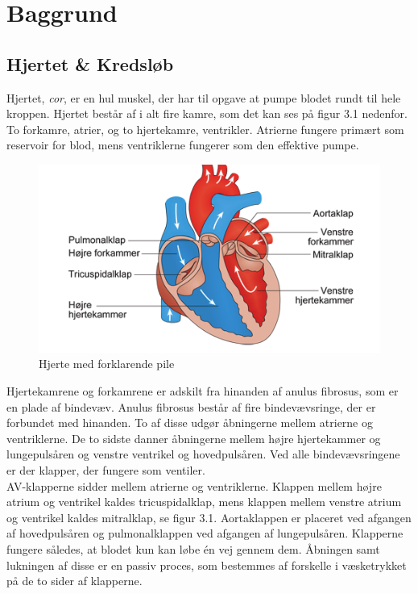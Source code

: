 \chapter{Baggrund}
\section{Hjertet \& Kredsløb}
Hjertet, \textit{cor}, er en hul muskel, der har til opgave at pumpe blodet rundt til hele kroppen. Hjertet består af i alt fire kamre, som det kan ses på figur 3.1 nedenfor. To forkamre, atrier, og to hjertekamre, ventrikler. Atrierne fungere primært som reservoir for blod, mens ventriklerne fungerer som den effektive pumpe.\\

\begin{figure}[htb]
	\centering
	\includegraphics[width=1\textwidth]{Figurer/Fysio/Hjertet}
	\caption{Hjerte med forklarende pile \protect\footnotemark} 
\end{figure}

Hjertekamrene og forkamrene er adskilt fra hinanden af anulus fibrosus, som er en plade af bindevæv. Anulus fibrosus består af fire bindevævsringe, der er forbundet med hinanden. To af disse udgør åbningerne mellem atrierne og ventriklerne. De to sidste danner åbningerne mellem højre hjertekammer og lungepulsåren og venstre ventrikel og hovedpulsåren. Ved alle bindevævsringene er der klapper, der fungere som ventiler.\\ 
AV-klapperne sidder mellem atrierne og ventriklerne. Klappen mellem højre atrium og ventrikel kaldes tricuspidalklap, mens klappen mellem venstre atrium og ventrikel kaldes mitralklap, se figur 3.1. Aortaklappen er placeret ved afgangen af hovedpulsåren og pulmonalklappen ved afgangen af lungepulsåren. Klapperne fungere således, at blodet kun kan løbe én vej gennem dem. Åbningen samt lukningen af disse er en passiv proces, som bestemmes af forskelle i væsketrykket på de to sider af klapperne.\\ 

